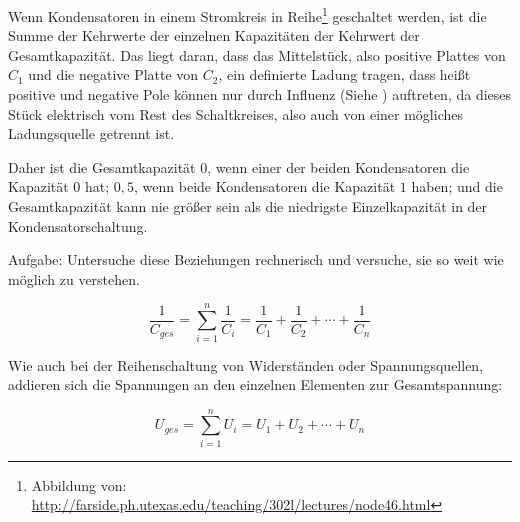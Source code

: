 Wenn Kondensatoren in einem Stromkreis in Reihe\footnote{Abbildung von: \url{http://farside.ph.utexas.edu/teaching/302l/lectures/node46.html}} geschaltet werden, ist die Summe der Kehrwerte der einzelnen Kapazitäten der Kehrwert der Gesamtkapazität. Das liegt daran, dass das \glqq Mittelstück\grqq , also positive Plattes von $C_1$ und die negative Platte von $C_2$, ein definierte Ladung tragen, dass heißt positive und negative Pole können nur durch Influenz (Siehe ) auftreten, da dieses Stück elektrisch vom Rest des Schaltkreises, also auch von einer mögliches Ladungsquelle getrennt ist.

Daher ist die Gesamtkapazität $0$, wenn einer der beiden Kondensatoren die Kapazität $0$ hat; $0,5$, wenn beide Kondensatoren die Kapazität $1$ haben; und die Gesamtkapazität kann nie größer sein als die niedrigste Einzelkapazität in der Kondensatorschaltung.

\begin{leftbar}
Aufgabe: Untersuche diese Beziehungen rechnerisch und versuche, sie so weit wie möglich zu verstehen.
\end{leftbar}


\begin{equation}
	\frac{1}{C_{ges}} = \sum\limits_{i=1}^n \frac{1}{C_i} = \frac{1}{C_1} + \frac{1}{C_2} + \cdots + \frac{1}{C_n}
\end{equation}

\noindent Wie auch bei der Reihenschaltung von Widerständen oder Spannungsquellen, addieren sich die Spannungen an den einzelnen Elementen zur Gesamtspannung:

\begin{equation}
	U_{ges} = \sum\limits_{i=1}^n U_i = U_1 + U_2 + \cdots + U_n
\end{equation}



